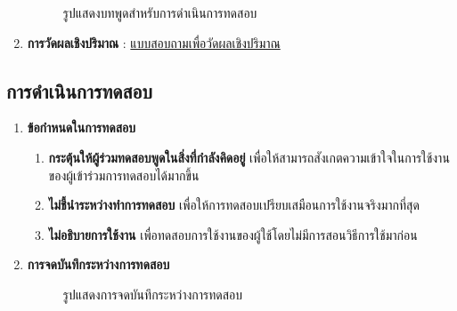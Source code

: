 \begin{enumerate}
\begin{figure}[H]
              \caption{รูปแสดงบทพูดสำหรับการดำเนินการทดสอบ}\label{fig:ScriptUT}
          \end{figure}
    \item \textbf{การวัดผลเชิงปริมาณ} : \href{https://forms.gle/cRmAQGtgpfCHbK5u8}{แบบสอบถามเพื่อวัดผลเชิงปริมาณ}
\end{enumerate}
\subsection{การดำเนินการทดสอบ}
\begin{enumerate}
    \item \textbf{ข้อกำหนดในการทดสอบ}
          \begin{enumerate}
              \item \textbf{กระตุ้นให้ผู้ร่วมทดสอบพูดในสิ่งที่กำลังคิดอยู่} เพื่อให้สามารถสังเกตความเข้าใจในการใช้งานของผู้เข้าร่วมการทดสอบได้มากขึ้น
              \item \textbf{ไม่ชี้นำระหว่างทำการทดสอบ} เพื่อให้การทดสอบเปรียบเสมือนการใช้งานจริงมากที่สุด
              \item \textbf{ไม่อธิบายการใช้งาน} เพื่อทดสอบการใช้งานของผู้ใช้โดยไม่มีการสอนวิธีการใช้มาก่อน
          \end{enumerate}
    \item \textbf{การจดบันทึกระหว่างการทดสอบ}
          \begin{figure}[H]\centering
              \caption{รูปแสดงการจดบันทึกระหว่างการทดสอบ}\label{fig:NoteTaking}
          \end{figure}
\end{enumerate}
